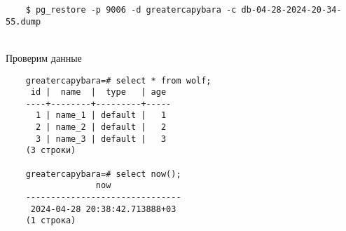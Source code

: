 \documentclass{article}
\begin{document}
\begin{verbatim}
    $ pg_restore -p 9006 -d greatercapybara -c db-04-28-2024-20-34-55.dump
\end{verbatim} \\
Проверим данные

\begin{verbatim}
    greatercapybara=# select * from wolf;
     id |  name  |  type   | age
    ----+--------+---------+-----
      1 | name_1 | default |   1
      2 | name_2 | default |   2
      3 | name_3 | default |   3
    (3 строки)
    
    greatercapybara=# select now();
                  now
    -------------------------------
     2024-04-28 20:38:42.713888+03
    (1 строка)
\end{verbatim}
\end{document}
